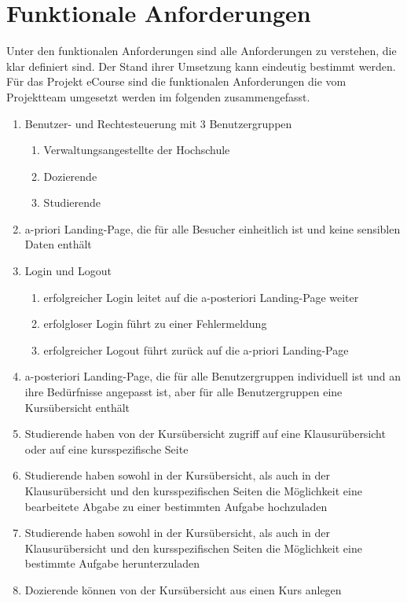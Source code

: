 
\chapter{Funktionale Anforderungen}
Unter den funktionalen Anforderungen sind alle Anforderungen zu verstehen, die klar definiert sind. Der Stand ihrer Umsetzung kann eindeutig bestimmt werden. \\
Für das Projekt eCourse sind die funktionalen Anforderungen die vom Projektteam umgesetzt werden im folgenden zusammengefasst.\\
\begin{enumerate}
	\item Benutzer- und Rechtesteuerung mit 3 Benutzergruppen
	\begin{enumerate}
		\item Verwaltungsangestellte der Hochschule
		\item Dozierende
		\item Studierende
	\end{enumerate}
	\item a-priori Landing-Page, die für alle Besucher einheitlich ist und keine sensiblen Daten enthält
	\item Login und Logout
	\begin{enumerate}
		\item erfolgreicher Login leitet auf die a-posteriori Landing-Page weiter
		\item erfolgloser Login führt zu einer Fehlermeldung
		\item erfolgreicher Logout führt zurück auf die a-priori Landing-Page
	\end{enumerate}
	\item a-posteriori Landing-Page, die für alle Benutzergruppen individuell ist und an ihre Bedürfnisse angepasst ist, aber für alle Benutzergruppen eine Kursübersicht enthält
	\item Studierende haben von der Kursübersicht zugriff auf eine Klausurübersicht oder auf eine kursspezifische Seite
	\item Studierende haben sowohl in der Kursübersicht, als auch in der Klausurübersicht und den kursspezifischen Seiten die Möglichkeit eine bearbeitete Abgabe zu einer bestimmten Aufgabe hochzuladen
	\item Studierende haben sowohl in der Kursübersicht, als auch in der Klausurübersicht und den kursspezifischen Seiten die Möglichkeit eine bestimmte Aufgabe herunterzuladen
	\item Dozierende können von der Kursübersicht aus einen Kurs anlegen

\end{enumerate}
